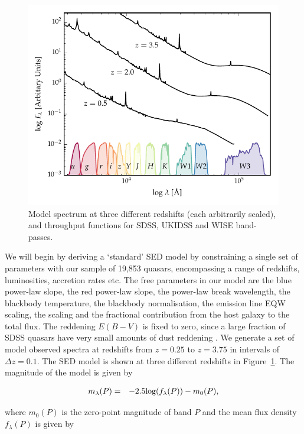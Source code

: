 \begin{figure}
  \centering
  \includegraphics[width=\textwidth]{figures/chapter05/throughput.pdf}
  \caption{Model spectrum at three different redshifts (each arbitrarily scaled), and throughput functions for SDSS, UKIDSS and WISE band-passes.}
  \label{fig:filters}
\end{figure}

We will begin by deriving a `standard' \ac{SED} model by constraining a single set of parameters with our sample of 19,853 quasars, encompassing a range of redshifts, luminosities, accretion rates etc. 
The free parameters in our model are the blue power-law slope, the red power-law slope, the power-law break wavelength, the blackbody temperature, the blackbody normalisation, the emission line \ac{EQW} scaling, the \ha scaling and the fractional contribution from the host galaxy to the total flux. 
The reddening $E(B-V)$ is fixed to zero, since a large fraction of \ac{SDSS} quasars have very small amounts of dust reddening \citep{richards03}. 
We generate a set of model observed spectra at redshifts from $z=0.25$ to $z=3.75$ in intervals of $\Delta z = 0.1$. 
The \ac{SED} model is shown at three different redshifts in Figure~\ref{fig:filters}. 
The magnitude of the model is given by 

\begin{eqnarray}
  m_\lambda(P) & = & -2.5{\rm log}(f_\lambda(P)) - m_0(P), 
\end{eqnarray}

where $m_0(P)$ is the zero-point magnitude of band $P$ and the mean flux density $f_{\lambda}(P)$ is given by 

